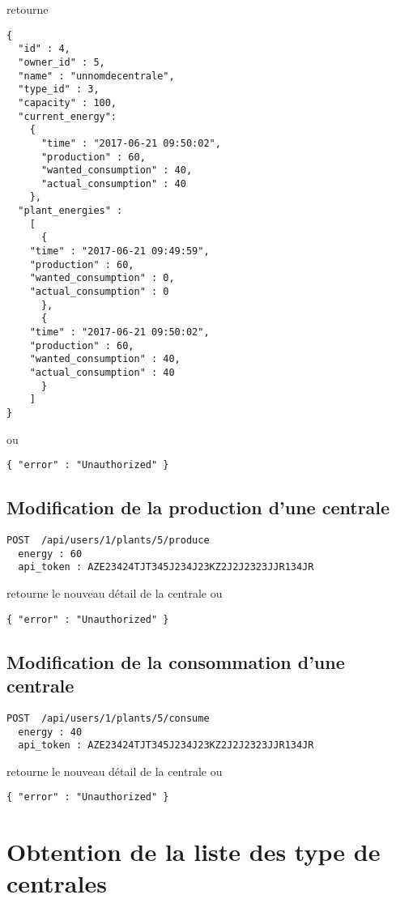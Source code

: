 retourne

\begin{lstlisting}
{
  "id" : 4,
  "owner_id" : 5,
  "name" : "unnomdecentrale",
  "type_id" : 3,
  "capacity" : 100,
  "current_energy":
    {
      "time" : "2017-06-21 09:50:02",
      "production" : 60,
      "wanted_consumption" : 40,
      "actual_consumption" : 40
    },
  "plant_energies" : 
    [
      {
	"time" : "2017-06-21 09:49:59",
	"production" : 60,
	"wanted_consumption" : 0,
	"actual_consumption" : 0
      },
      {
	"time" : "2017-06-21 09:50:02",
	"production" : 60,
	"wanted_consumption" : 40,
	"actual_consumption" : 40
      }
    ]
}
\end{lstlisting}

ou 

\begin{lstlisting}
{ "error" : "Unauthorized" }
\end{lstlisting}

\subsection{Modification de la production d'une centrale}

\begin{lstlisting}
POST  /api/users/1/plants/5/produce
  energy : 60
  api_token : AZE23424TJT345J234J23KZ2J2J2323JJR134JR
\end{lstlisting}

retourne le nouveau détail de la centrale ou 

\begin{lstlisting}
{ "error" : "Unauthorized" }
\end{lstlisting}

\subsection{Modification de la consommation d'une centrale}

\begin{lstlisting}
POST  /api/users/1/plants/5/consume
  energy : 40
  api_token : AZE23424TJT345J234J23KZ2J2J2323JJR134JR
\end{lstlisting}

retourne le nouveau détail de la centrale ou 

\begin{lstlisting}
{ "error" : "Unauthorized" }
\end{lstlisting}

\section{Obtention de la liste des type de centrales}


